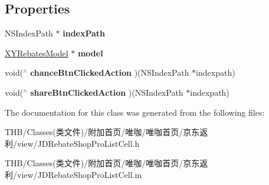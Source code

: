 \subsection*{Properties}
\begin{DoxyCompactItemize}
\item 
\mbox{\label{interface_j_d_rebate_shop_pro_list_cell_a11faba40c1fe71b80aeece993234f32e}} 
N\+S\+Index\+Path $\ast$ {\bfseries index\+Path}
\item 
\mbox{\label{interface_j_d_rebate_shop_pro_list_cell_a7045f957ca5685a744f0764edbb40e9a}} 
\mbox{\hyperlink{interface_x_y_rebates_model}{X\+Y\+Rebates\+Model}} $\ast$ {\bfseries model}
\item 
\mbox{\label{interface_j_d_rebate_shop_pro_list_cell_a998a6742a5cdd47fb886cf0834d21790}} 
void($^\wedge$ {\bfseries chance\+Btn\+Clicked\+Action} )(N\+S\+Index\+Path $\ast$indexpath)
\item 
\mbox{\label{interface_j_d_rebate_shop_pro_list_cell_ad2d8edff78db4ea1e166d53851968833}} 
void($^\wedge$ {\bfseries share\+Btn\+Clicked\+Action} )(N\+S\+Index\+Path $\ast$indexpath)
\end{DoxyCompactItemize}


The documentation for this class was generated from the following files\+:\begin{DoxyCompactItemize}
\item 
T\+H\+B/\+Classes(类文件)/附加首页/唯咖/唯咖首页/京东返利/view/J\+D\+Rebate\+Shop\+Pro\+List\+Cell.\+h\item 
T\+H\+B/\+Classes(类文件)/附加首页/唯咖/唯咖首页/京东返利/view/J\+D\+Rebate\+Shop\+Pro\+List\+Cell.\+m\end{DoxyCompactItemize}
